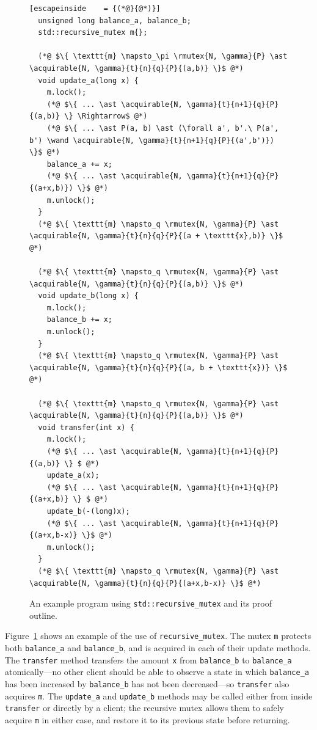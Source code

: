 \begin{figure}[htb]
\begin{lstlisting}[escapeinside    = {(*@}{@*)}]
  unsigned long balance_a, balance_b;
  std::recursive_mutex m{};

  (*@ $\{ \texttt{m} \mapsto_\pi \rmutex{N, \gamma}{P} \ast \acquirable{N, \gamma}{t}{n}{q}{P}{(a,b)} \}$ @*)
  void update_a(long x) {
    m.lock();
    (*@ $\{ ... \ast \acquirable{N, \gamma}{t}{n+1}{q}{P}{(a,b)} \} \Rightarrow$ @*)
    (*@ $\{ ... \ast P(a, b) \ast (\forall a', b'.\ P(a', b') \wand \acquirable{N, \gamma}{t}{n+1}{q}{P}{(a',b')}) \}$ @*)
    balance_a += x;
    (*@ $\{ ... \ast \acquirable{N, \gamma}{t}{n+1}{q}{P}{(a+x,b)}) \}$ @*)
    m.unlock();
  }
  (*@ $\{ \texttt{m} \mapsto_q \rmutex{N, \gamma}{P} \ast \acquirable{N, \gamma}{t}{n}{q}{P}{(a + \texttt{x},b)} \}$ @*)

  (*@ $\{ \texttt{m} \mapsto_q \rmutex{N, \gamma}{P} \ast \acquirable{N, \gamma}{t}{n}{q}{P}{(a,b)} \}$ @*)
  void update_b(long x) {
    m.lock();
    balance_b += x;
    m.unlock();
  }
  (*@ $\{ \texttt{m} \mapsto_q \rmutex{N, \gamma}{P} \ast \acquirable{N, \gamma}{t}{n}{q}{P}{(a, b + \texttt{x})} \}$ @*)

  (*@ $\{ \texttt{m} \mapsto_q \rmutex{N, \gamma}{P} \ast \acquirable{N, \gamma}{t}{n}{q}{P}{(a,b)} \}$ @*)
  void transfer(int x) {
    m.lock();
    (*@ $\{ ... \ast \acquirable{N, \gamma}{t}{n+1}{q}{P}{(a,b)} \} $ @*)
    update_a(x);
    (*@ $\{ ... \ast \acquirable{N, \gamma}{t}{n+1}{q}{P}{(a+x,b)} \} $ @*)
    update_b(-(long)x);
    (*@ $\{ ... \ast \acquirable{N, \gamma}{t}{n+1}{q}{P}{(a+x,b-x)} \}$ @*)
    m.unlock();
  }
  (*@ $\{ \texttt{m} \mapsto_q \rmutex{N, \gamma}{P} \ast \acquirable{N, \gamma}{t}{n}{q}{P}{(a+x,b-x)} \}$ @*)
\end{lstlisting}
\caption{An example program using \lstinline{std::recursive_mutex} and its proof outline.}
\label{rmutex-ex-proof}
\end{figure}

Figure~\ref{rmutex-ex-proof} shows an example of the use of \lstinline{recursive_mutex}. The mutex \lstinline{m} protects both \lstinline{balance_a} and \lstinline{balance_b}, and is acquired in each of their update methods. The \lstinline{transfer} method transfers the amount \lstinline{x} from \lstinline{balance_b} to \lstinline{balance_a} atomically---no other client should be able to observe a state in which \lstinline{balance_a} has been increased by \lstinline{balance_b} has not been decreased---so \lstinline{transfer} also acquires \lstinline{m}. The \lstinline{update_a} and \lstinline{update_b} methods may be called either from inside \lstinline{transfer} or directly by a client; the recursive mutex allows them to safely acquire \lstinline{m} in either case, and restore it to its previous state before returning.

